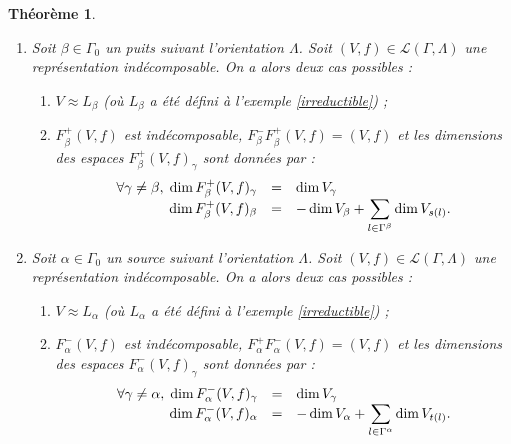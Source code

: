 \documentclass[a4paper,11pt]{article}
\newtheorem{thm}{Théorème}[section]
\newcommand{\dps}{\displaystyle}
\begin{document}
\begin{thm}
	\label{thm1}
	\begin{enumerate}
		Soit $(\Gamma,\Lambda)$ un carquois.
	\item Soit $\beta\in\Gamma_0 $ un puits suivant l'orientation $\Lambda$. Soit $(V,f)\in\mathscr L(\Gamma,\Lambda)$ une représentation indécomposable. On a alors deux cas possibles :
			\begin{enumerate}
				\item $V\approx L_\beta$ (où $L_\beta$ a été défini à l'exemple \ref{irreductible}) ;
				\item $F_\beta^+(V,f)$ est indécomposable, $F_\beta^-F_\beta^+(V,f)=(V,f)$ et les dimensions des espaces $F_\beta^+(V,f)_\gamma$ sont données par :
					\[
\begin{array}{>{\dps}r>{\dps}l>{\dps}l}
	\forall\gamma\neq\beta,\;\dim F_\beta^+(V,f)_\gamma&=& \dim V_\gamma\\
	\dim F_\beta^+(V,f)_\beta&=& -\dim V_\beta+\sum_{l\in\Gamma^{\beta}}\dim V_{s(l)}.
\end{array}
					\]
			\end{enumerate}
		\item Soit $\alpha\in\Gamma_0 $ un source suivant l'orientation $\Lambda$. Soit $(V,f)\in\mathscr L(\Gamma,\Lambda)$ une représentation indécomposable. On a alors deux cas possibles :
			\begin{enumerate}
				\item $V\approx L_\alpha$ (où $L_\alpha$ a été défini à l'exemple \ref{irreductible}) ;
				\item $F_\alpha^-(V,f)$ est indécomposable, $F_\alpha^+F_\alpha^-(V,f)=(V,f)$ et les dimensions des espaces $F_\alpha^-(V,f)_\gamma$ sont données par :
					\[
\begin{array}{>{\dps}r>{\dps}l>{\dps}l}
	\forall\gamma\neq\alpha,\;\dim F_\alpha^-(V,f)_\gamma&=& \dim V_\gamma\\
	\dim F_\alpha^-(V,f)_\alpha&=& -\dim V_\alpha+\sum_{l\in\Gamma^{\alpha}}\dim V_{t(l)}.
\end{array}
					\]
			\end{enumerate}
	
	\end{enumerate}
\end{thm}
\end{document}
